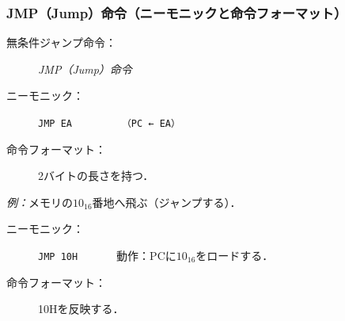 \documentclass[handout]{beamer}        %
\begin{document}
\begin{frame}
  \frametitle{JMP（Jump）命令（ニーモニックと命令フォーマット）}
  \begin{description}
  \item[無条件ジャンプ命令：]\emph{JMP（Jump）命令}
    \vfill

  \item[ニーモニック：]\texttt{JMP EA}~~~~~~~~~\texttt{（PC ← EA）}
    \vfill

  \item[命令フォーマット：] 2バイトの長さを持つ．\\
  \end{description}
  \vfill

  \emph{例：}メモリの$10_{16}$番地へ飛ぶ（ジャンプする）．
  \begin{description}
  \item[ニーモニック：]\texttt{JMP 10H}~~~~~~~動作：PCに$10_{16}$をロードする．

  \item[命令フォーマット：] 10Hを反映する．\\
  \end{description}
  \vfill
\end{frame}
\end{document}
